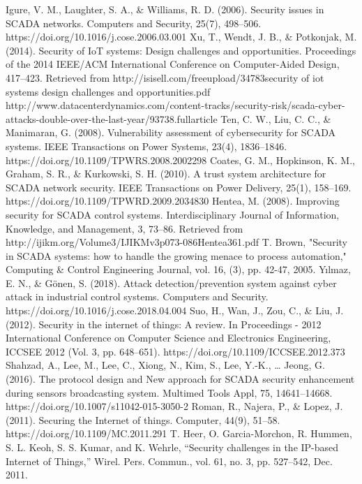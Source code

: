 \documentclass[letterpaper, 10 pt, conference]{ieeeconf}  %
\begin{document}
\begin{thebibliography}{99}
 Igure, V. M., Laughter, S. A., \& Williams, R. D. (2006). Security issues in SCADA networks. Computers and Security, 25(7), 498–506. https://doi.org/10.1016/j.cose.2006.03.001
Xu, T., Wendt, J. B., \& Potkonjak, M. (2014). Security of IoT systems: Design challenges and opportunities. Proceedings of the 2014 IEEE/ACM International Conference on Computer-Aided Design, 417–423. Retrieved from http://isisell.com/freeupload/34783security of iot systems design challenges and opportunities.pdf
http://www.datacenterdynamics.com/content-tracks/security-risk/scada-cyber-attacks-double-over-the-last-year/93738.fullarticle
Ten, C. W., Liu, C. C., \& Manimaran, G. (2008). Vulnerability assessment of cybersecurity for SCADA systems. IEEE Transactions on Power Systems, 23(4), 1836–1846. https://doi.org/10.1109/TPWRS.2008.2002298
Coates, G. M., Hopkinson, K. M., Graham, S. R., \& Kurkowski, S. H. (2010). A trust system architecture for SCADA network security. IEEE Transactions on Power Delivery, 25(1), 158–169. https://doi.org/10.1109/TPWRD.2009.2034830
Hentea, M. (2008). Improving security for SCADA control systems. Interdisciplinary Journal of Information, Knowledge, and Management, 3, 73–86. Retrieved from http://ijikm.org/Volume3/IJIKMv3p073-086Hentea361.pdf
T. Brown, "Security in SCADA systems: how to handle the growing menace to process automation," Computing \& Control Engineering Journal, vol. 16, (3), pp. 42-47, 2005.
Yılmaz, E. N., \& Gönen, S. (2018). Attack detection/prevention system against cyber attack in industrial control systems. Computers and Security. https://doi.org/10.1016/j.cose.2018.04.004
Suo, H., Wan, J., Zou, C., \& Liu, J. (2012). Security in the internet of things: A review. In Proceedings - 2012 International Conference on Computer Science and Electronics Engineering, ICCSEE 2012 (Vol. 3, pp. 648–651). https://doi.org/10.1109/ICCSEE.2012.373
Shahzad, A., Lee, M., Lee, C., Xiong, N., Kim, S., Lee, Y.-K., … Jeong, G. (2016). The protocol design and New approach for SCADA security enhancement during sensors broadcasting system. Multimed Tools Appl, 75, 14641–14668. https://doi.org/10.1007/s11042-015-3050-2
Roman, R., Najera, P., \& Lopez, J. (2011). Securing the Internet of things. Computer, 44(9), 51–58. https://doi.org/10.1109/MC.2011.291
T. Heer, O. Garcia-Morchon, R. Hummen, S. L. Keoh, S. S. Kumar, and K. Wehrle, “Security challenges in the IP-based Internet of Things,” Wirel. Pers. Commun., vol. 61, no. 3, pp. 527–542, Dec. 2011.

\end{thebibliography}
\end{document}
